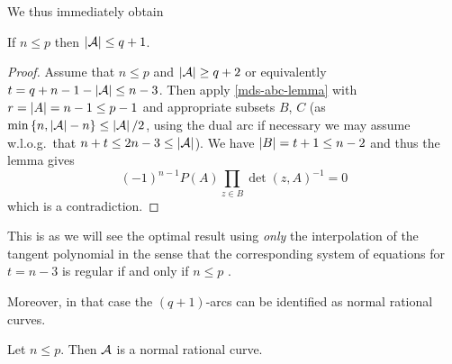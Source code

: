We thus immediately obtain

\begin{corollary}\label{mds-bound-n-leq-p}
  If $n\leq p$ then $\left\vert{\mathcal{A}}\right\vert\leq q+1$.
\end{corollary}

\begin{proof}
  Assume that $n\leq p$ and $\left\vert{\mathcal{A}}\right\vert\geq q+2$ or equivalently $t=q+n-1-\left\vert{\mathcal{A}}\right\vert\leq
  n-3$. Then apply \autoref{mds-abc-lemma} with
  $r=\left\vert{A}\right\vert=n-1\leq p-1$ and appropriate subsets $B$, $C$ (as $\min\set{n,\card{\cA}-n}\leq\card{\cA}/2$, using the dual arc  if necessary we may assume w.l.o.g.\ that $n+t\leq 2n-3\leq\left\vert{\mathcal{A}}\right\vert$).
  We have $\left\vert{B}\right\vert=t+1\leq n-2$ and thus the lemma gives
  $$
    {(-1)}^{n-1}P(A)\prod_{z\in B}{{\det(z,A)}^{-1}}=0
  $$
  which is a contradiction.
\end{proof}

\begin{remark}
    This is as we will see the optimal result using \emph{only} the interpolation
    of the tangent polynomial in the sense that the corresponding system of equations for $t=n-3$ is regular if and only if $n\leq p$ .  %
\end{remark}

Moreover, in that case the $(q+1)$-arcs can be identified as normal rational
curves.

\begin{corollary}\label{mds-class-n-leq-p}
    Let $n\leq p$. Then $\mathcal{A}$ is a normal rational curve.
\end{corollary}

